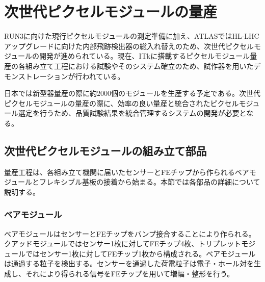 \chapter{次世代ピクセルモジュールの量産}
\label{sec:singatapixel-devel}
RUN3に向けた現行ピクセルモジュールの測定準備に加え、ATLASではHL-LHCアップグレードに向けた内部飛跡検出器の総入れ替えのため、次世代ピクセルモジュールの開発が進められている。現在、ITkに搭載するピクセルモジュール量産の各組み立て工程における試験やそのシステム確立のため、試作器を用いたデモンストレーションが行われている。

日本では新型器量産の際に約$2000$個のモジュールを生産する予定である。次世代ピクセルモジュールの量産の際に、効率の良い量産と統合されたピクセルモジュール選定を行うため、品質試験結果を統合管理するシステムの開発が必要となる。


\section{次世代ピクセルモジュールの組み立て部品}
\label{sec:component}
量産工程は、各組み立て機関に届いたセンサーとFEチップから作られるベアモジュールとフレキシブル基板の接着から始まる。本節では各部品の詳細について説明する。


\subsection{ベアモジュール}
\label{sec:bare}

ベアモジュールはセンサーとFEチップをバンプ接合することにより作られる。クアッドモジュールではセンサー1枚に対してFEチップ4枚、トリプレットモジュールではセンサー1枚に対してFEチップ1枚から構成される。ベアモジュールは通過する粒子を検出する。センサーを通過した荷電粒子は電子・ホール対を生成し、それにより得られる信号をFEチップを用いて増幅・整形を行う。


